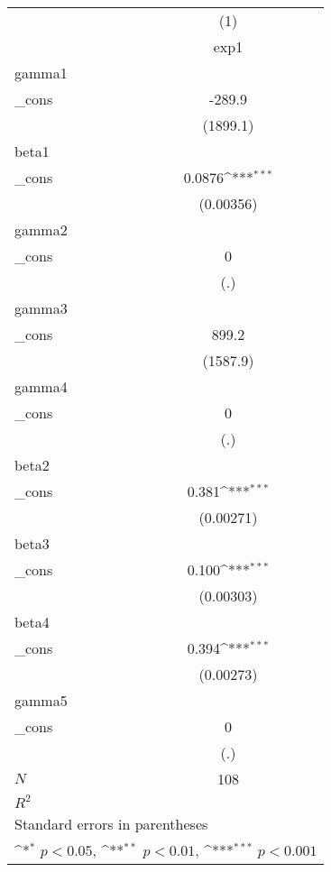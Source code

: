 {
\def\sym#1{\ifmmode^{#1}\else\(^{#1}\)\fi}
\begin{tabular}{l*{1}{c}}
\hline\hline
            &\multicolumn{1}{c}{(1)}\\
            &\multicolumn{1}{c}{exp1}\\
\hline
gamma1      &                     \\
\_cons      &      -289.9         \\
            &    (1899.1)         \\
\hline
beta1       &                     \\
\_cons      &      0.0876\sym{***}\\
            &   (0.00356)         \\
\hline
gamma2      &                     \\
\_cons      &           0         \\
            &         (.)         \\
\hline
gamma3      &                     \\
\_cons      &       899.2         \\
            &    (1587.9)         \\
\hline
gamma4      &                     \\
\_cons      &           0         \\
            &         (.)         \\
\hline
beta2       &                     \\
\_cons      &       0.381\sym{***}\\
            &   (0.00271)         \\
\hline
beta3       &                     \\
\_cons      &       0.100\sym{***}\\
            &   (0.00303)         \\
\hline
beta4       &                     \\
\_cons      &       0.394\sym{***}\\
            &   (0.00273)         \\
\hline
gamma5      &                     \\
\_cons      &           0         \\
            &         (.)         \\
\hline
\(N\)       &         108         \\
\(R^{2}\)   &                     \\
\hline\hline
\multicolumn{2}{l}{\footnotesize Standard errors in parentheses}\\
\multicolumn{2}{l}{\footnotesize \sym{*} \(p<0.05\), \sym{**} \(p<0.01\), \sym{***} \(p<0.001\)}\\
\end{tabular}
}
